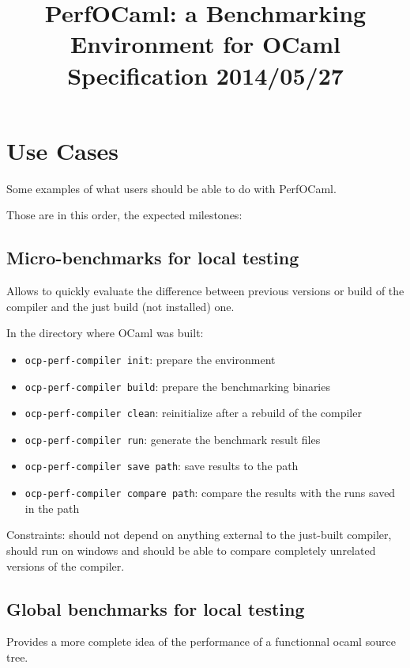 \documentclass[11pt,a4paper]{article}
\begin{document}
\title{PerfOCaml: a Benchmarking Environment for OCaml\\Specification 2014/05/27}

\maketitle

\section{Use Cases}

Some examples of what users should be able to do with PerfOCaml.

Those are in this order, the expected milestones:

\subsection{Micro-benchmarks for local testing}

Allows to quickly evaluate the difference between previous versions or
build of the compiler and the just build (not installed) one.

In the directory where OCaml was built:
\begin{itemize}
\item {\tt ocp-perf-compiler init}: prepare the environment
\item {\tt ocp-perf-compiler build}: prepare the benchmarking binaries
\item {\tt ocp-perf-compiler clean}: reinitialize after a rebuild of the compiler
\item {\tt ocp-perf-compiler run}: generate the benchmark result files
\item {\tt ocp-perf-compiler save path}: save results to the path
\item {\tt ocp-perf-compiler compare path}: compare the results with the runs saved in the path
\end{itemize}

Constraints: should not depend on anything external to the just-built
compiler, should run on windows and should be able to compare
completely unrelated versions of the compiler.

\subsection{Global benchmarks for local testing}

Provides a more complete idea of the performance of a functionnal
ocaml source tree.
\end{document}
